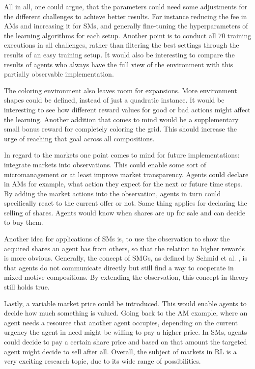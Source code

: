 All in all, one could argue, that the parameters could need some adjustments for the different challenges to achieve better results. For instance reducing the fee in AMs and increasing it for SMs, and generally fine-tuning the hyperparameters of the learning algorithms for each setup. Another point is to conduct all 70 training executions in all challenges, rather than filtering the best settings through the results of an easy training setup. It would also be interesting to compare the results of agents who always have the full view of the environment with this partially observable implementation.

The coloring environment also leaves room for expansions. More environment shapes could be defined, instead of just a quadratic instance. It would be interesting to see how different reward values for good or bad actions might affect the learning. Another addition that comes to mind would be a supplementary small bonus reward for completely coloring the grid. This should increase the urge of reaching that goal across all compositions.

In regard to the markets one point comes to mind for future implementations: integrate markets into observations. This could enable some sort of micromanagement or at least improve market transparency. Agents could declare in AMs for example, what action they expect for the next or future time steps. By adding the market actions into the observation, agents in turn could specifically react to the current offer or not. Same thing applies for declaring the selling of shares. Agents would know when shares are up for sale and can decide to buy them. 

Another idea for applications of SMs is, to use the observation to show the acquired shares an agent has from others, so that the relation to higher rewards is more obvious. Generally, the concept of SMGs, as defined by Schmid et al. \cite{scbe21}, is that agents do not communicate directly but still find a way to cooperate in mixed-motive compositions. By extending the observation, this concept in theory still holds true.

Lastly, a variable market price could be introduced. This would enable agents to decide how much something is valued. Going back to the AM example, where an agent needs a resource that another agent occupies, depending on the current urgency the agent in need might be willing to pay a higher price. In SMs, agents could decide to pay a certain share price and based on that amount the targeted agent might decide to sell after all. Overall, the subject of markets in RL is a very exciting research topic, due to its wide range of possibilities.